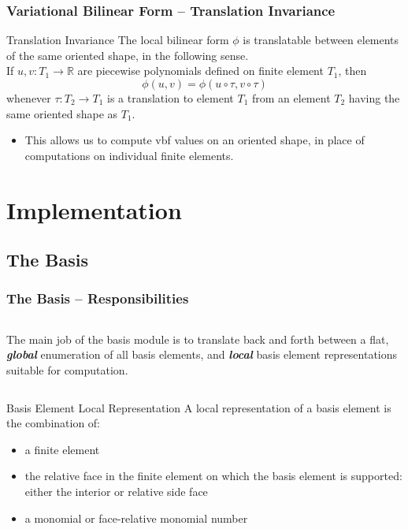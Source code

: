 \documentclass[compress]{beamer}
\begin{document}
\begin{frame}
  \frametitle{Variational Bilinear Form -- Translation Invariance}
  \begin{block}{Translation Invariance}
  The local bilinear form $\phi$ is translatable between elements of the same oriented shape, in the following sense.\\
  If $u, v: T_1 \rightarrow \mathbb{R}$ are piecewise polynomials defined on finite element $T_1$, then
    $$\phi(u, v) = \phi(u \circ \tau, v \circ \tau)$$
      whenever $\tau: T_2 \rightarrow T_1$ is a translation to element $T_1$ from an element $T_2$ having
      the same oriented shape as $T_1$.
  \end{block}
  \pause
  \begin{itemize}[<+->]
    \item This allows us to compute vbf values on an oriented shape, in place of computations on individual finite elements.
  \end{itemize}
\end{frame}

\section{Implementation}

\subsection{The Basis}

\begin{frame}
  \frametitle{The Basis -- Responsibilities}
  \begin{columns}
    The main job of the basis module is to translate back and forth between a flat, \emph{\textbf{global}} enumeration
    of all basis elements, and \emph{\textbf{local}} basis element representations suitable for computation.
  \end{columns}
  \pause
  \begin{block}{Basis Element Local Representation}
    A local representation of a basis element is the combination of:
    \begin{itemize}[<+->]
      \item a finite element
      \item the relative face in the finite element on which the basis element is supported: either the interior or relative side face
      \item a monomial or face-relative monomial number
    \end{itemize}
  \end{block}
\end{frame}
\end{document}
